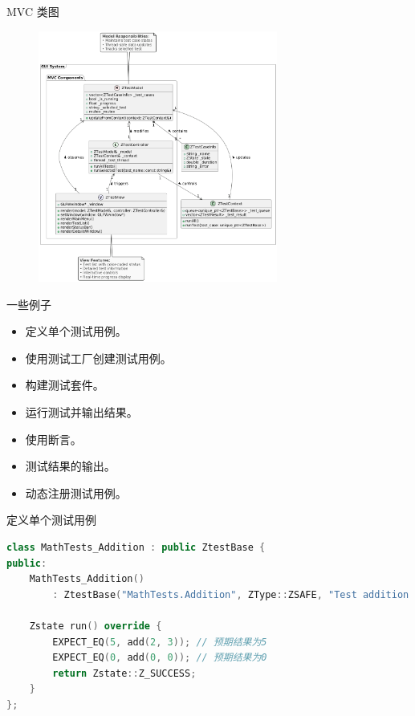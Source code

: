\documentclass{beamer}
\begin{document}
\begin{frame}{MVC 类图}
    \begin{figure}[H]
        \centering
        \includegraphics[width=0.7\textwidth]{img/umlgui.png} %
        \label{fig:diagram}
    \end{figure}
\end{frame}
\begin{frame}{一些例子}
    \begin{itemize}
        \item 定义单个测试用例。
        \item 使用测试工厂创建测试用例。
        \item 构建测试套件。
        \item 运行测试并输出结果。
        \item 使用断言。
        \item 测试结果的输出。
        \item 动态注册测试用例。
    \end{itemize}
\end{frame}

\begin{frame}[fragile]{定义单个测试用例}
    \begin{lstlisting}[language=C++]
class MathTests_Addition : public ZtestBase {
public:
    MathTests_Addition()
        : ZtestBase("MathTests.Addition", ZType::ZSAFE, "Test addition function") {}

    Zstate run() override {
        EXPECT_EQ(5, add(2, 3)); // 预期结果为5
        EXPECT_EQ(0, add(0, 0)); // 预期结果为0
        return Zstate::Z_SUCCESS;
    }
};
    \end{lstlisting}
\end{frame}
\end{document}
